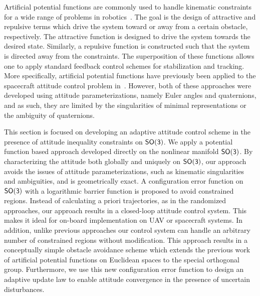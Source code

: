 Artificial potential functions are commonly used to handle kinematic constraints for a wide range of problems in robotics~\cite{rimon1992}.
The goal is the design of attractive and repulsive terms which drive the system toward or away from a certain obstacle, respectively.
The attractive function is designed to drive the system towards the desired state.
Similarly, a repulsive function is constructed such that the system is directed away from the constraints. 
The superposition of these functions allows one to apply standard feedback control schemes for stabilization and tracking.
More specifically, artificial potential functions have previously been applied to the spacecraft attitude control problem in~\cite{lee2011b,mcinnes1994}.
However, both of these approaches were developed using attitude parameterizations, namely Euler angles and quaternions, and as such, they are limited by the singularities of minimal representations or the ambiguity of quaternions.

This section is focused on developing an adaptive attitude control scheme in the presence of attitude inequality constraints on \(\mathsf{SO(3)}\).
We apply a potential function based approach developed directly on the nonlinear manifold \(\mathsf{SO(3)}\). 
By characterizing the attitude both globally and uniquely on \(\mathsf{SO(3)}\), our approach avoids the issues of attitude parameterizations, such as kinematic singularities and ambiguities, and is geometrically exact. 
A configuration error function on \(\mathsf{SO(3)}\) with a logarithmic barrier function is proposed to avoid constrained regions. 
Instead of calculating a priori trajectories, as in the randomized approaches, our approach results in a closed-loop attitude control system. 
This makes it ideal for on-board implementation on UAV or spacecraft systems. 
In addition, unlike previous approaches our control system can handle an arbitrary number of constrained regions without modification.
This approach results in a conceptually simple obstacle avoidance scheme which extends the previous work of artificial potential functions on Euclidean spaces to the special orthogonal group.
Furthermore, we use this new configuration error function to design an adaptive update law to enable attitude convergence in the presence of uncertain disturbances. 


